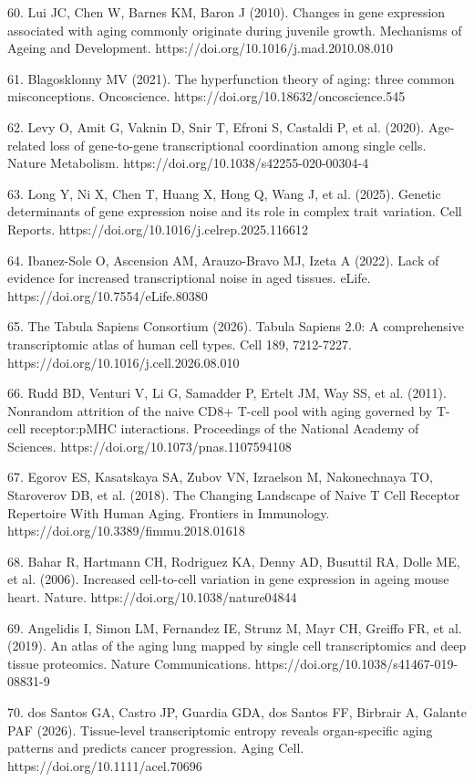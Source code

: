 \documentclass[11pt]{article}
\begin{document}
60. Lui JC, Chen W, Barnes KM, Baron J (2010). Changes in gene expression associated with aging commonly originate during juvenile growth. Mechanisms of Ageing and Development. https://doi.org/10.1016/j.mad.2010.08.010

61. Blagosklonny MV (2021). The hyperfunction theory of aging: three common misconceptions. Oncoscience. https://doi.org/10.18632/oncoscience.545

62. Levy O, Amit G, Vaknin D, Snir T, Efroni S, Castaldi P, et al. (2020). Age-related loss of gene-to-gene transcriptional coordination among single cells. Nature Metabolism. https://doi.org/10.1038/s42255-020-00304-4

63. Long Y, Ni X, Chen T, Huang X, Hong Q, Wang J, et al. (2025). Genetic determinants of gene expression noise and its role in complex trait variation. Cell Reports. https://doi.org/10.1016/j.celrep.2025.116612

64. Ibanez-Sole O, Ascension AM, Arauzo-Bravo MJ, Izeta A (2022). Lack of evidence for increased transcriptional noise in aged tissues. eLife. https://doi.org/10.7554/eLife.80380

65. The Tabula Sapiens Consortium (2026). Tabula Sapiens 2.0: A comprehensive transcriptomic atlas of human cell types. Cell 189, 7212-7227. https://doi.org/10.1016/j.cell.2026.08.010

66. Rudd BD, Venturi V, Li G, Samadder P, Ertelt JM, Way SS, et al. (2011). Nonrandom attrition of the naive CD8+ T-cell pool with aging governed by T-cell receptor:pMHC interactions. Proceedings of the National Academy of Sciences. https://doi.org/10.1073/pnas.1107594108

67. Egorov ES, Kasatskaya SA, Zubov VN, Izraelson M, Nakonechnaya TO, Staroverov DB, et al. (2018). The Changing Landscape of Naive T Cell Receptor Repertoire With Human Aging. Frontiers in Immunology. https://doi.org/10.3389/fimmu.2018.01618

68. Bahar R, Hartmann CH, Rodriguez KA, Denny AD, Busuttil RA, Dolle ME, et al. (2006). Increased cell-to-cell variation in gene expression in ageing mouse heart. Nature. https://doi.org/10.1038/nature04844

69. Angelidis I, Simon LM, Fernandez IE, Strunz M, Mayr CH, Greiffo FR, et al. (2019). An atlas of the aging lung mapped by single cell transcriptomics and deep tissue proteomics. Nature Communications. https://doi.org/10.1038/s41467-019-08831-9

70. dos Santos GA, Castro JP, Guardia GDA, dos Santos FF, Birbrair A, Galante PAF (2026). Tissue-level transcriptomic entropy reveals organ-specific aging patterns and predicts cancer progression. Aging Cell. https://doi.org/10.1111/acel.70696
\end{document}
